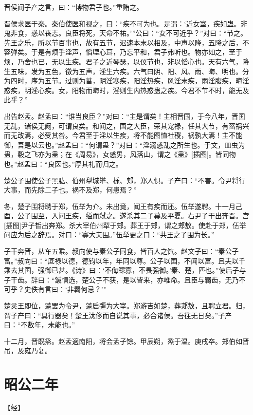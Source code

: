 \documentclass[a4paper,12pt,UTF8,twoside]{ctexbook}
\begin{document}
晋侯闻子产之言，曰：“博物君子也。”重贿之。

晋侯求医于秦。秦伯使医和视之，曰：“疾不可为也。是谓：‘近女室，疾如蛊。非鬼非食，惑以丧志。良臣将死，天命不祐。’”公曰：“女不可近乎？”对曰：“节之。先王之乐，所以节百事也，故有五节，迟速本末以相及，中声以降，五降之后，不容弹矣。于是有烦手淫声，慆堙心耳，乃忘平和，君子弗听也。物亦如之，至于烦，乃舍也已，无以生疾。君子之近琴瑟，以仪节也，非以慆心也。天有六气，降生五味，发为五色，徵为五声，淫生六疾。六气曰阴、阳、风、雨、晦、明也。分为四时，序为五节。过则为菑，阴淫寒疾，阳淫热疾，风淫末疾，雨淫腹疾，晦淫惑疾，明淫心疾。女，阳物而晦时，淫则生内热惑蛊之疾。今君不节不时，能无及此乎？”

出告赵孟。赵孟曰：“谁当良臣？”对曰：“主是谓矣！主相晋国，于今八年，晋国无乱，诸侯无阙，可谓良矣。和闻之，国之大臣，荣其宠禄，任其大节，有菑祸兴而无改焉，必受其咎。今君至于淫以生疾，将不能图恤社稷，祸孰大焉！主不能御，吾是以云也。”赵孟曰：“何谓蛊？”对曰：“淫溺惑乱之所生也。于文，皿虫为蛊，穀之飞亦为蛊；在《周易》，女惑男，风落山，谓之《蛊》[插图]。皆同物也。”赵孟曰：“良医也。”厚其礼而归之。

楚公子围使公子黑肱、伯州犁城犫、栎、郏，郑人惧。子产曰：“不害。令尹将行大事，而先除二子也。祸不及郑，何患焉？”

冬，楚子围将聘于郑，伍举为介。未出竟，闻王有疾而还。伍举遂聘。十一月己酉，公子围至，入问王疾，缢而弑之。遂杀其二子幕及平夏。右尹子干出奔晋。宫[插图]尹子晳出奔郑。杀大宰伯州犁于郏。葬王于郏，谓之郏敖。使赴于郑，伍举问应为后之辞焉。对曰：“寡大夫围。”伍举更之曰：“共王之子围为长。”

子干奔晋，从车五乘。叔向使与秦公子同食，皆百人之饩。赵文子曰：“秦公子富。”叔向曰：“厎禄以德，德钧以年，年同以尊。公子以国，不闻以富。且夫以千乘去其国，强御已甚。《诗》曰：‘不侮鳏寡，不畏强御。’秦、楚，匹也。”使后子与子干齿。辞曰：“鍼惧选，楚公子不获，是以皆来，亦唯命。且臣与羇齿，无乃不可乎？史佚有言曰：‘非羇何忌？’”

楚灵王即位，薳罢为令尹，薳启彊为大宰。郑游吉如楚，葬郏敖，且聘立君。归，谓子产曰：“具行器矣！楚王汰侈而自说其事，必合诸侯。吾往无日矣。”子产曰：“不数年，未能也。”

十二月，晋既烝。赵孟適南阳，将会孟子馀。甲辰朔，烝于温。庚戌卒。郑伯如晋吊，及雍乃复。


\section{昭公二年}



【经】
\end{document}
